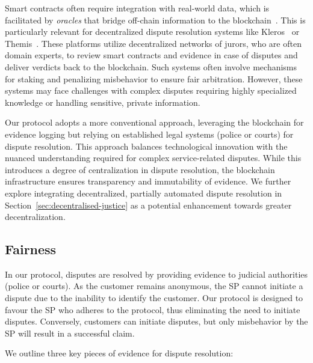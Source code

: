 \documentclass[pdftex,twocolumn,epjc3]{svjour3}
\begin{document}
\begin{sloppypar}
Smart contracts often require integration with real-world data, which is facilitated by \textit{oracles} that bridge off-chain information to the blockchain~\cite{breidenbachChainlinkNextSteps2021}. This is particularly relevant for decentralized dispute resolution systems like Kleros~\cite{bergollaKlerosSociolegalCase2022, nappertDecentralizedJusticeReinventing2020, gudkovCrowdArbitrationBlockchain2020} or Themis~\cite{mengThemisDecentralizedEscrow2019}. These platforms utilize decentralized networks of jurors, who are often domain experts, to review smart contracts and evidence in case of disputes and deliver verdicts back to the blockchain.  Such systems often involve mechanisms for staking and penalizing misbehavior to ensure fair arbitration. However, these systems may face challenges with complex disputes requiring highly specialized knowledge or handling sensitive, private information.
\end{sloppypar}

Our protocol adopts a more conventional approach, leveraging the blockchain for evidence logging but relying on established legal systems (police or courts) for dispute resolution. This approach balances technological innovation with the nuanced understanding required for complex service-related disputes. While this introduces a degree of centralization in dispute resolution, the blockchain infrastructure ensures transparency and immutability of evidence. We further explore integrating decentralized, partially automated dispute resolution in Section~\ref{sec:decentralised-justice} as a potential enhancement towards greater decentralization.

\subsection{Fairness}\label{fairness}
In our protocol, disputes are resolved by providing evidence to judicial authorities (police or courts). As the customer remains anonymous, the SP cannot initiate a dispute due to the inability to identify the customer. Our protocol is designed to favour the SP who adheres to the protocol, thus eliminating the need to initiate disputes. Conversely, customers can initiate disputes, but only misbehavior by the SP will result in a successful claim.

We outline three key pieces of evidence for dispute resolution:
\end{document}
